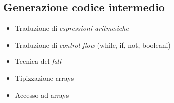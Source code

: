 \subsection{Generazione codice intermedio}
\begin{itemize}
	\item Traduzione di \textit{espressioni aritmetiche}
	\item Traduzione di \textit{control flow} (while, if, not, booleani)
	\item Tecnica del \textit{fall}
	\item Tipizzazione arrays
	\item Accesso ad arrays
\end{itemize}
%
%
%
%
%
%
%
%
%
%
